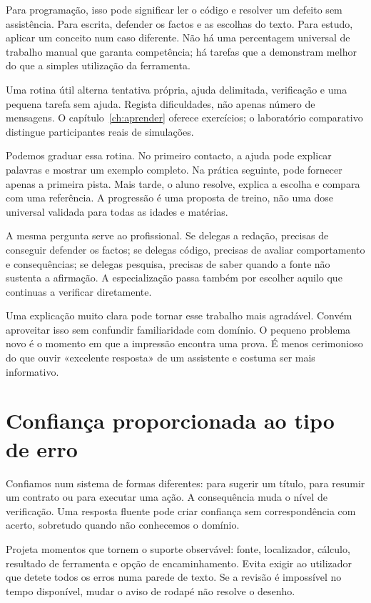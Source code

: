 Para programação, isso pode significar ler o código e resolver um defeito sem assistência. Para escrita, defender os factos e as escolhas do texto. Para estudo, aplicar um conceito num caso diferente. Não há uma percentagem universal de trabalho manual que garanta competência; há tarefas que a demonstram melhor do que a simples utilização da ferramenta.

Uma rotina útil alterna tentativa própria, ajuda delimitada, verificação e uma pequena tarefa sem ajuda. Regista dificuldades, não apenas número de mensagens. O capítulo~\ref{ch:aprender} oferece exercícios; o laboratório comparativo distingue participantes reais de simulações.

Podemos graduar essa rotina. No primeiro contacto, a ajuda pode explicar palavras e mostrar um exemplo completo. Na prática seguinte, pode fornecer apenas a primeira pista. Mais tarde, o aluno resolve, explica a escolha e compara com uma referência. A progressão é uma proposta de treino, não uma dose universal validada para todas as idades e matérias.

A mesma pergunta serve ao profissional. Se delegas a redação, precisas de conseguir defender os factos; se delegas código, precisas de avaliar comportamento e consequências; se delegas pesquisa, precisas de saber quando a fonte não sustenta a afirmação. A especialização passa também por escolher aquilo que continuas a verificar diretamente.

Uma explicação muito clara pode tornar esse trabalho mais agradável. Convém aproveitar isso sem confundir familiaridade com domínio. O pequeno problema novo é o momento em que a impressão encontra uma prova. É menos cerimonioso do que ouvir «excelente resposta» de um assistente e costuma ser mais informativo.

\section{Confiança proporcionada ao tipo de erro}
Confiamos num sistema de formas diferentes: para sugerir um título, para resumir um contrato ou para executar uma ação. A consequência muda o nível de verificação. Uma resposta fluente pode criar confiança sem correspondência com acerto, sobretudo quando não conhecemos o domínio.

Projeta momentos que tornem o suporte observável: fonte, localizador, cálculo, resultado de ferramenta e opção de encaminhamento. Evita exigir ao utilizador que detete todos os erros numa parede de texto. Se a revisão é impossível no tempo disponível, mudar o aviso de rodapé não resolve o desenho.

